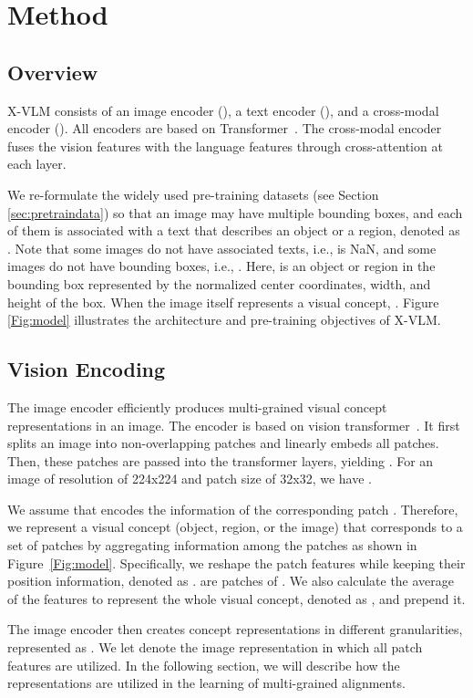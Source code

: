 \documentclass[nohyperref]{article}
\theoremstyle{plain}
\theoremstyle{definition}
\theoremstyle{remark}
\begin{document}
\section{Method}

\subsection{Overview}
X-VLM consists of an image encoder (), a text encoder (), and a cross-modal encoder (). All encoders are based on Transformer~\cite{vaswani2017attention}. The cross-modal encoder fuses the vision features with the language features through cross-attention at each layer.


We re-formulate the widely used pre-training datasets (see Section \ref{sec:pretraindata}) so that an image may have multiple bounding boxes, and each of them is associated with a text that describes an object or a region, denoted as . Note that some images do not have associated texts, i.e.,  is NaN, and some images do not have bounding boxes, i.e., . Here,  is an object or region in the bounding box  represented by the normalized center coordinates, width, and height of the box. When the image itself represents a visual concept, . Figure \ref{Fig:model} illustrates the architecture and pre-training objectives of X-VLM. 


\subsection{Vision Encoding}  
The image encoder efficiently produces multi-grained visual concept representations in an image. The encoder is based on vision transformer~\cite{dosovitskiy2020image}. It first splits an image into non-overlapping patches and linearly embeds all patches. Then, these patches are passed into the transformer layers, yielding . For an image of resolution of 224x224 and patch size of 32x32, we have . 


We assume that  encodes the information of the corresponding patch . Therefore, we represent a visual concept  (object, region, or the image) that corresponds to a set of patches by aggregating information among the patches as shown in Figure~\ref{Fig:model}. Specifically, we reshape the patch features while keeping their position information, denoted as .  are patches of . We also calculate the average of the features to represent the whole visual concept, denoted as , and prepend it. 


The image encoder then creates  concept representations in different granularities, represented as . We let  denote the image representation in which all patch features are utilized. In the following section, we will describe how the representations are utilized in the learning of multi-grained alignments.
\end{document}

